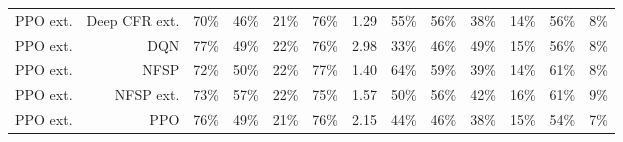 \begin{tabular}{lrrrrrrrrrrrr}
PPO ext. & Deep CFR ext. & 70\% & 46\% & 21\% & 76\% & 1.29 & 55\% & 56\% & 38\% & 14\% & 56\% & 8\% \\
PPO ext. & DQN & 77\% & 49\% & 22\% & 76\% & 2.98 & 33\% & 46\% & 49\% & 15\% & 56\% & 8\% \\
PPO ext. & NFSP & 72\% & 50\% & 22\% & 77\% & 1.40 & 64\% & 59\% & 39\% & 14\% & 61\% & 8\% \\
PPO ext. & NFSP ext. & 73\% & 57\% & 22\% & 75\% & 1.57 & 50\% & 56\% & 42\% & 16\% & 61\% & 9\% \\
PPO ext. & PPO & 76\% & 49\% & 21\% & 76\% & 2.15 & 44\% & 46\% & 38\% & 15\% & 54\% & 7\% \\
\bottomrule
\end{tabular}
